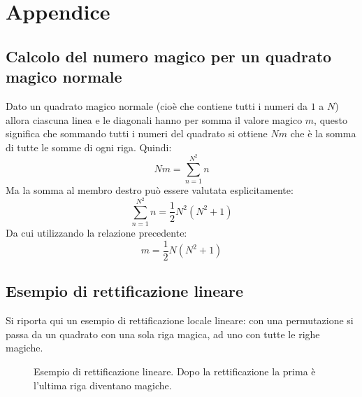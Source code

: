 \documentclass[italian,twoside,twocolumn]{article}
\begin{document}
\section{Appendice}

\subsection{Calcolo del numero magico per un quadrato magico normale}
Dato un quadrato magico normale (cioè che contiene tutti i numeri da $ 1 $ a $ N $) allora ciascuna linea e le diagonali hanno per somma il valore magico $ \mathit{m} $, questo significa che sommando tutti i numeri del quadrato si ottiene $  N \mathit{m} $ che è la somma di tutte le somme di ogni riga. Quindi:
\[  N \mathit{m} = \sum_{n = 1}^{N^2}n		\]
Ma la somma al membro destro può essere valutata esplicitamente:
\[	\sum_{n = 1}^{N^2}n = \frac{1}{2} N^2 (N^2 + 1)	\]
Da cui utilizzando la relazione precedente:
\[	 \mathit{m} = \frac{1}{2} N (N^2 + 1)	\]

\subsection{Esempio di rettificazione lineare}
Si riporta qui un esempio di rettificazione locale lineare: con una permutazione si passa da un quadrato con una sola riga magica, ad uno con tutte le righe magiche.
\begin{figure}[htbp]
	\centering
	\caption{Esempio di rettificazione lineare. Dopo la rettificazione la prima è l'ultima riga diventano magiche.}
	
\end{figure}
\end{document}
